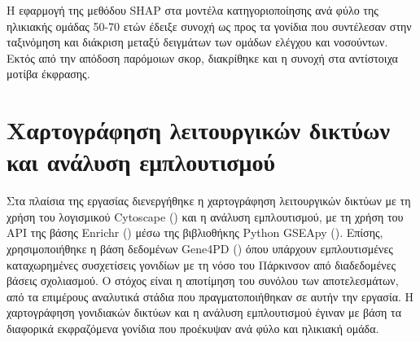 \documentclass[12pt]{report}
\begin{document}
        \par
            Η εφαρμογή της μεθόδου SHAP στα μοντέλα κατηγοριοποίησης ανά φύλο της ηλικιακής ομάδας 50-70 ετών έδειξε συνοχή ως προς τα γονίδια που συντέλεσαν στην ταξινόμηση και διάκριση μεταξύ δειγμάτων των ομάδων ελέγχου και νοσούντων. Εκτός από την απόδοση παρόμοιων σκορ, διακρίθηκε και η συνοχή στα αντίστοιχα μοτίβα έκφρασης.

    \section{Χαρτογράφηση λειτουργικών δικτύων και ανάλυση εμπλουτισμού}
            Στα πλαίσια της εργασίας διενεργήθηκε η χαρτογράφηση λειτουργικών δικτύων με τη χρήση του λογισμικού Cytoscape (\emph{\cite{Shannon2003Cytoscape:Networks}}) και η ανάλυση εμπλουτισμού, με τη χρήση του API  της βάσης Enrichr (\emph{\cite{Chen2013Enrichr:Tool}}) μέσω της βιβλιοθήκης Python GSEApy (\emph{\cite{Fang2023GSEApy:Python}}). Επίσης, χρησιμοποιήθηκε η βάση δεδομένων Gene4PD (\emph{\cite{Li2021Gene4PD:Disease}}) όπου υπάρχουν εμπλουτισμένες καταχωρημένες συσχετίσεις γονιδίων με τη νόσο του Πάρκινσον από διαδεδομένες βάσεις σχολιασμού. Ο στόχος είναι η αποτίμηση του συνόλου των αποτελεσμάτων, από τα επιμέρους αναλυτικά στάδια που πραγματοποιήθηκαν σε αυτήν την εργασία. Η χαρτογράφηση γονιδιακών δικτύων και η ανάλυση εμπλουτισμού έγιναν με βάση τα διαφορικά εκφραζόμενα γονίδια που προέκυψαν ανά φύλο και ηλικιακή ομάδα.
        \par
\end{document}
